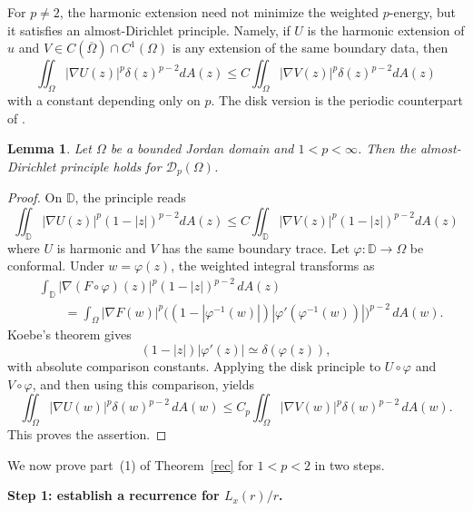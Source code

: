 \documentclass[11pt]{article}
\numberwithin{equation}{section}
\newtheorem{lemma}[theorem]{Lemma}
\theoremstyle{remark}
\begin{document}
For $p\ne2$, the harmonic extension need not minimize the weighted 
$p$-energy, but it satisfies an almost-Dirichlet principle.  Namely, if $U$
is the harmonic extension of $u$ and $V\in C(\overline\Omega)\cap
C^1(\Omega)$ is any extension of the same boundary data, then
$$
\iint_\Omega|\nabla U(z)|^p \delta(z)^{p-2}dA(z) \leq C \iint_\Omega|\nabla V(z)|^p \delta(z)^{p-2}dA(z)
$$
with a constant depending only on $p$.  The disk version
is the periodic counterpart of \cite[Theorem~1.11]{MR}.

\begin{lemma}\label{almost1p}
Let $\Omega$ be a bounded Jordan domain and $1<p<\infty$.  Then the
almost-Dirichlet principle holds for $\mathcal D_p(\Omega)$.
\end{lemma}
\begin{proof}
On $\mathbb D$, the principle reads
\begin{equation}    
\iint_{\mathbb D}|\nabla U(z)|^p (1-|z|)^{p-2}dA(z) \leq  C\iint_{\mathbb D}|\nabla V(z)|^p (1-|z|)^{p-2}dA(z) 
\end{equation}
where $U$ is harmonic and $V$ has the same boundary trace.  Let
$\varphi:\mathbb D\to\Omega$ be conformal.  Under $w=\varphi(z)$, the
weighted integral transforms as
\begin{align*}
&\int_{\mathbb D}|\nabla(F\circ\varphi)(z)|^p
(1-|z|)^{p-2}\,dA(z)\\
&\qquad=\int_\Omega |\nabla F(w)|^p
\bigl((1-|\varphi^{-1}(w)|)|\varphi'(\varphi^{-1}(w))|\bigr)^{p-2}
\,dA(w).
\end{align*}
Koebe's theorem gives
\[
(1-|z|)|\varphi'(z)|\simeq\delta(\varphi(z)),
\]
with absolute comparison constants.  Applying the disk principle to
$U\circ\varphi$ and $V\circ\varphi$, and then using this comparison, yields
\begin{equation}    
\iint_{\Omega}|\nabla U(w)|^p \delta(w)^{p-2}\,dA(w)
\leq C_p\iint_{\Omega}|\nabla V(w)|^p
\delta(w)^{p-2}\,dA(w).
\end{equation}
This proves the assertion.
\end{proof}

\medskip

We now prove part~\rm(1) of Theorem~\ref{rec} for $1<p<2$ in two
steps.

\textbf{Step 1: establish a recurrence for $L_x(r)/r$.}
\end{document}
